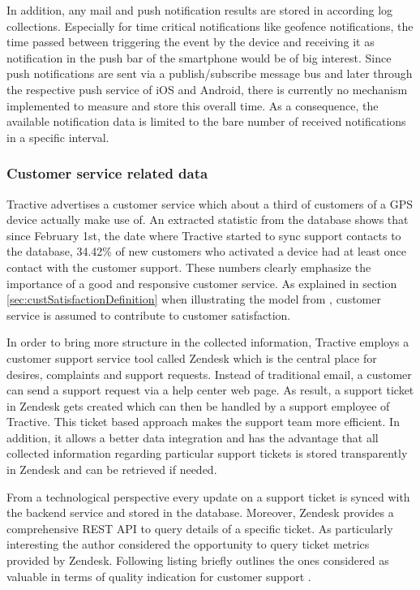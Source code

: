 In addition, any mail and push notification results are stored in according log collections. 
Especially for time critical notifications like geofence notifications, the time passed between triggering the event by the device and receiving it as notification in the push bar of the smartphone would be of big interest. Since push notifications are sent via a publish/subscribe message bus and later through the respective push service of iOS and Android, there is currently no mechanism implemented to measure and store this overall time. As a consequence, the available notification data is limited to the bare number of received notifications in a specific interval. 

\subsubsection{Customer service related data}
Tractive advertises a customer service which about a third of customers of a GPS device actually make use of. An extracted statistic from the database shows that since February 1st, the date where Tractive started to sync support contacts to the database, 34.42\% of new customers who activated a device had at least once contact with the customer support. These numbers clearly emphasize the importance of a good and responsive customer service. As explained in section \ref{sec:custSatisfactionDefinition} when illustrating the model from \cite{johnson2001evolution}, customer service is assumed to contribute to customer satisfaction. 

In order to bring more structure in the collected information, Tractive employs a customer support service tool called Zendesk which is the central place for desires, complaints and support requests. Instead of traditional email, a customer can send a support request via a help center web page. As result, a support ticket in Zendesk gets created which can then be handled by a support employee of Tractive. This ticket based approach makes the support team more efficient. In addition, it allows a better data integration and has the advantage that all collected information regarding particular support tickets is stored transparently in Zendesk and can be retrieved if needed.

From a technological perspective every update on a support ticket is synced with the backend service and stored in the database. Moreover, Zendesk provides a comprehensive REST API to query details of a specific ticket. As particularly interesting the author considered the opportunity to query ticket metrics provided by Zendesk. Following listing briefly outlines the ones considered as valuable in terms of quality indication for customer support \cite{zendeskWeb}.

